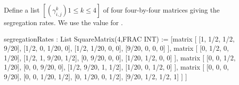 {{{{{{{{{{{{{{{{{{\begin{xtc}
\begin{xtccomment}
Define a list
$[(\gamma_{i,j}^k) 1 \le k \le 4]$
of four four-by-four matrices giving the segregation
rates.
We use the value  for \smath{\theta}.
\end{xtccomment}
\begin{spadsrc}
segregationRates : List SquareMatrix(4,FRAC INT) := [matrix [ [1, 1/2, 1/2, 9/20], [1/2, 0, 1/20, 0], [1/2, 1/20, 0, 0], [9/20, 0, 0, 0] ], matrix [ [0, 1/2, 0, 1/20], [1/2, 1, 9/20, 1/2], [0, 9/20, 0, 0], [1/20, 1/2, 0, 0] ], matrix [ [0, 0, 1/2, 1/20], [0, 0, 9/20, 0], [1/2, 9/20, 1, 1/2], [1/20, 0, 1/2, 0] ], matrix [ [0, 0, 0, 9/20], [0, 0, 1/20, 1/2], [0, 1/20, 0, 1/2], [9/20, 1/2, 1/2, 1] ] ] 
\end{spadsrc}
\begin{TeXOutput}
\begin{fricasmath}{1}
%
\end{fricasmath}
\end{TeXOutput}
\end{xtc}
}}}}}}}}}}}}}}}}}}
